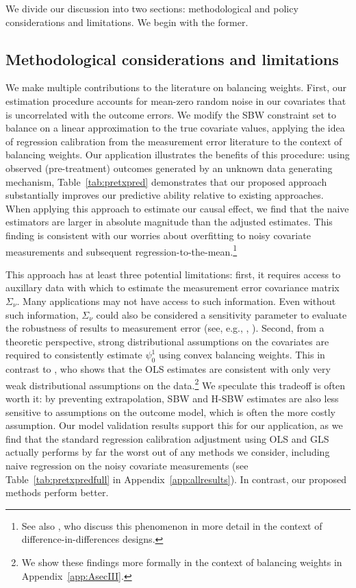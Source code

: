 \documentclass[aoas]{imsart}
\theoremstyle{plain}
\theoremstyle{remark}
\begin{document}
We divide our discussion into two sections: methodological and policy considerations and limitations. We begin with the former.

\subsection{Methodological considerations and limitations}

We make multiple contributions to the literature on balancing weights. First, our estimation procedure accounts for mean-zero random noise in our covariates that is uncorrelated with the outcome errors. We modify the SBW constraint set to balance on a linear approximation to the true covariate values, applying the idea of regression calibration from the measurement error literature to the context of balancing weights. Our application illustrates the benefits of this procedure: using observed (pre-treatment) outcomes generated by an unknown data generating mechanism, Table~\ref{tab:pretxpred} demonstrates that our proposed approach substantially improves our predictive ability relative to existing approaches. When applying this approach to estimate our causal effect, we find that the naive estimators are larger in absolute magnitude than the adjusted estimates. This finding is consistent with our worries about overfitting to noisy covariate measurements and subsequent regression-to-the-mean.\footnote{See also \cite{daw2018matching}, who discuss this phenomenon in more detail in the context of difference-in-differences designs.}

This approach has at least three potential limitations: first, it requires access to auxillary data with which to estimate the measurement error covariance matrix $\Sigma_{\nu}$. Many applications may not have access to such information. Even without such information, $\Sigma_{\nu}$ could also be considered a sensitivity parameter to evaluate the robustness of results to measurement error (see, e.g., \cite{huque2014impact}, \cite{illenberger2020impact}). Second, from a theoretic perspective, strong distributional assumptions on the covariates are required to consistently estimate $\psi_0^1$ using convex balancing weights. This in contrast to \cite{gleser1992importance}, who shows that the OLS estimates are consistent with only very weak distributional assumptions on the data.\footnote{We show these findings more formally in the context of balancing weights in Appendix~\ref{app:AsecIII}.} We speculate this tradeoff is often worth it: by preventing extrapolation, SBW and H-SBW estimates are also less sensitive to assumptions on the outcome model, which is often the more costly assumption. Our model validation results support this for our application, as we find that the standard regression calibration adjustment using OLS and GLS actually performs by far the worst out of any methods we consider, including naive regression on the noisy covariate measurements (see Table~\ref{tab:pretxpredfull} in Appendix~\ref{app:allresults}). In contrast, our proposed methods perform better.
\end{document}

